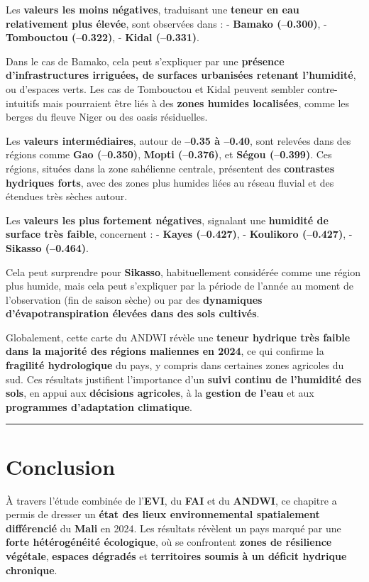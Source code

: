 \documentclass[
]{book}
\begin{document}
Les \textbf{valeurs les moins négatives}, traduisant une \textbf{teneur en eau relativement plus élevée}, sont observées dans :
- \textbf{Bamako (--0.300)},
- \textbf{Tombouctou (--0.322)},
- \textbf{Kidal (--0.331)}.

Dans le cas de Bamako, cela peut s'expliquer par une \textbf{présence d'infrastructures irriguées, de surfaces urbanisées retenant l'humidité}, ou d'espaces verts. Les cas de Tombouctou et Kidal peuvent sembler contre-intuitifs mais pourraient être liés à des \textbf{zones humides localisées}, comme les berges du fleuve Niger ou des oasis résiduelles.

Les \textbf{valeurs intermédiaires}, autour de \textbf{--0.35 à --0.40}, sont relevées dans des régions comme \textbf{Gao (--0.350)}, \textbf{Mopti (--0.376)}, et \textbf{Ségou (--0.399)}. Ces régions, situées dans la zone sahélienne centrale, présentent des \textbf{contrastes hydriques forts}, avec des zones plus humides liées au réseau fluvial et des étendues très sèches autour.

Les \textbf{valeurs les plus fortement négatives}, signalant une \textbf{humidité de surface très faible}, concernent :
- \textbf{Kayes (--0.427)},
- \textbf{Koulikoro (--0.427)},
- \textbf{Sikasso (--0.464)}.

Cela peut surprendre pour \textbf{Sikasso}, habituellement considérée comme une région plus humide, mais cela peut s'expliquer par la période de l'année au moment de l'observation (fin de saison sèche) ou par des \textbf{dynamiques d'évapotranspiration élevées dans des sols cultivés}.

Globalement, cette carte du ANDWI révèle une \textbf{teneur hydrique très faible dans la majorité des régions maliennes en 2024}, ce qui confirme la \textbf{fragilité hydrologique} du pays, y compris dans certaines zones agricoles du sud. Ces résultats justifient l'importance d'un \textbf{suivi continu de l'humidité des sols}, en appui aux \textbf{décisions agricoles}, à la \textbf{gestion de l'eau} et aux \textbf{programmes d'adaptation climatique}.

\begin{center}\rule{0.5\linewidth}{0.5pt}\end{center}

\section{Conclusion}\label{conclusion-2}

À travers l'étude combinée de l'\textbf{EVI}, du \textbf{FAI} et du \textbf{ANDWI}, ce chapitre a permis de dresser un \textbf{état des lieux environnemental spatialement différencié} du \textbf{Mali} en 2024. Les résultats révèlent un pays marqué par une \textbf{forte hétérogénéité écologique}, où se confrontent \textbf{zones de résilience végétale}, \textbf{espaces dégradés} et \textbf{territoires soumis à un déficit hydrique chronique}.
\end{document}
